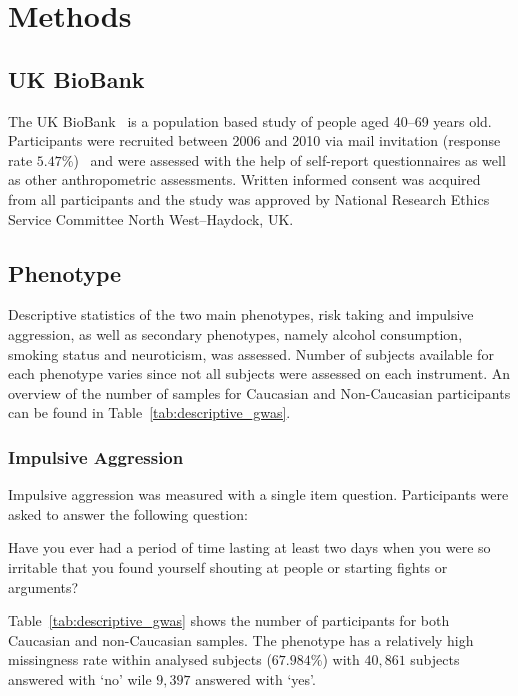 \section{Methods}
\label{sec:methods}

\subsection{UK BioBank}
\label{sub:uk_biobank}
The UK BioBank~\cite{Allen2014} is a population based study of people aged 40--69 years old. 
Participants were recruited between 2006 and 2010 via mail invitation (response rate $5.47\%$)~\cite{Sudlow2015} and were assessed with the help of self-report questionnaires as well as other anthropometric assessments.
Written informed consent was acquired from all participants and the study was approved by National Research Ethics Service Committee North West–Haydock, UK\@.

\subsection{Phenotype}
\label{sub:phenotype}

Descriptive statistics of the two main phenotypes, risk taking and impulsive aggression,
as well as secondary phenotypes, namely alcohol consumption, smoking status and neuroticism, was assessed.  
Number of subjects available for each phenotype varies since not all subjects were assessed on each instrument.
An overview of the number of samples for Caucasian and Non-Caucasian participants can be found in Table~\ref{tab:descriptive_gwas}.

\subsubsection{Impulsive Aggression}
\label{ssub:impulsive_aggression}
Impulsive aggression was measured with a single item question.
Participants were asked to answer the following question:
\begin{displayquote}
  Have you ever had a period of time lasting at least two days when you were so irritable that you found yourself shouting at people or starting fights or arguments?
\end{displayquote}
Table~\ref{tab:descriptive_gwas} shows the number of participants for both Caucasian and non-Caucasian samples.
The phenotype has a relatively high missingness rate within analysed subjects ($67.984\%$) with $40,861$ subjects answered with `no' wile $9,397$ answered with `yes'.

